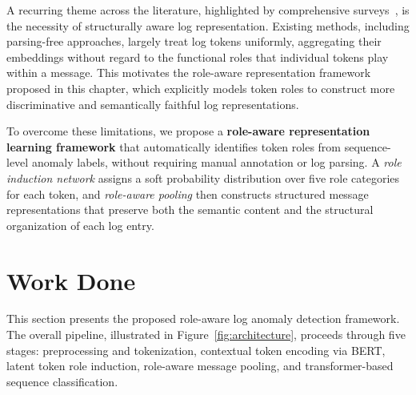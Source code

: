 A recurring theme across the literature, highlighted by comprehensive surveys~\cite{landauer2023survey}, is the necessity of structurally aware log representation. Existing methods, including parsing-free approaches, largely treat log tokens uniformly, aggregating their embeddings without regard to the functional roles that individual tokens play within a message. This motivates the role-aware representation framework proposed in this chapter, which explicitly models token roles to construct more discriminative and semantically faithful log representations.

To overcome these limitations, we propose a \textbf{role-aware representation learning framework} that automatically identifies token roles from sequence-level anomaly labels, without requiring manual annotation or log parsing. A \textit{role induction network} assigns a soft probability distribution over five role categories for each token, and \textit{role-aware pooling} then constructs structured message representations that preserve both the semantic content and the structural organization of each log entry.


\section{Work Done}
\label{sec:lad-work}

This section presents the proposed role-aware log anomaly detection framework. The overall pipeline, illustrated in Figure~\ref{fig:architecture}, proceeds through five stages: preprocessing and tokenization, contextual token encoding via BERT, latent token role induction, role-aware message pooling, and transformer-based sequence classification.

